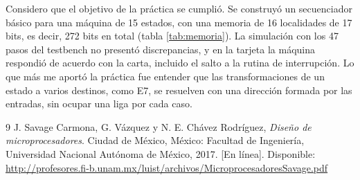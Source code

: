 Considero que el objetivo de la práctica se cumplió. Se construyó un secuenciador básico para una
máquina de 15 estados, con una memoria de 16 localidades de 17 bits, es decir, 272 bits en total
(tabla \ref{tab:memoria}). La simulación con los 47 pasos del testbench no presentó discrepancias,
y en la tarjeta la máquina respondió de acuerdo con la carta, incluido el salto a la rutina de
interrupción. Lo que más me aportó la práctica fue entender que las transformaciones de un estado
a varios destinos, como E7, se resuelven con una dirección formada por las entradas, sin ocupar
una liga por cada caso.

\renewcommand{\refname}{Bibliografía}
\begin{thebibliography}{9}
 J. Savage Carmona, G. Vázquez y N. E. Chávez Rodríguez,
  \emph{Diseño de microprocesadores}. Ciudad de México, México: Facultad de Ingeniería,
  Universidad Nacional Autónoma de México, 2017. [En línea]. Disponible:
  \url{http://profesores.fi-b.unam.mx/luist/archivos/MicroprocesadoresSavage.pdf}
\end{thebibliography}

